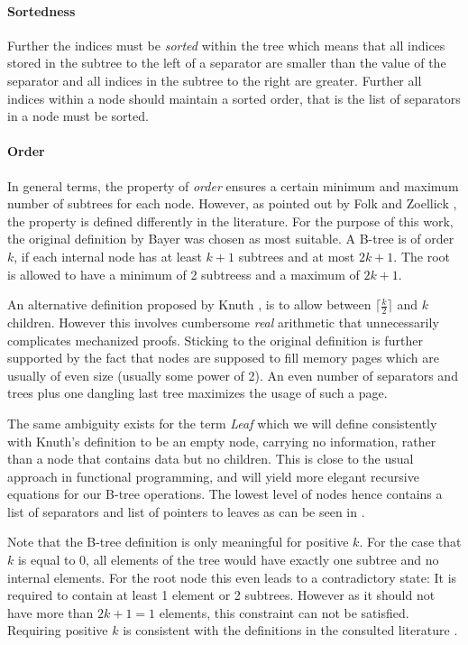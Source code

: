 \paragraph{Sortedness} Further the indices must be \textit{sorted} within the tree which means that all indices stored
in the subtree to the left of a separator are smaller than the value of the separator
and all indices in the subtree to the right are greater.
Further all indices within a node should maintain a sorted order,
that is the list of separators in a node must be sorted.

\paragraph{Order} In general terms, the property of \textit{order} ensures a certain minimum and maximum
number of subtrees for each node.
However, as pointed out by Folk and Zoellick \parencite{DBLP:books/daglib/0095349_mod},
the property is defined differently in the literature.
For the purpose of this work, the original definition by Bayer
was chosen as most suitable.
A B-tree is of order $k$, if each internal node has at least $k+1$
subtrees and at most $2k+1$.
The root is allowed to have a minimum of 2 subtreess and a maximum of $2k+1$.

An alternative definition proposed by Knuth \parencite{DBLP:books/lib/Knuth98a},
is to allow between $\lceil \frac{k}{2} \rceil$ and $k$ children.
However this involves cumbersome \textit{real} arithmetic that unnecessarily complicates
mechanized proofs.
Sticking to the original definition is further supported by the fact that nodes are supposed
to fill memory pages which are usually of even size (usually some power of 2).
An even number of separators and trees plus one dangling last tree maximizes
the usage of such a page.

The same ambiguity exists for the term \textit{Leaf} which we will define consistently with Knuth's definition \parencite{DBLP:books/lib/Knuth98a}
to be an empty node, carrying no information,
rather than a node that contains data but no children.
This is close to the usual approach in functional programming,
and will yield more elegant recursive equations for our B-tree operations.
The lowest level of nodes hence contains a list of separators and
list of pointers to leaves as can be seen in .

Note that the B-tree definition is only meaningful for positive $k$.
For the case that $k$ is equal to 0,
all elements of the tree would have exactly one subtree
and no internal elements.
For the root node this even leads to a contradictory state:
It is required to contain at least 1 element or 2 subtrees.
However as it should not have more than $2k+1 = 1$ elements,
this constraint can not be satisfied.
Requiring positive $k$ is consistent with the definitions
in the consulted literature \parencite{DBLP:journals/acta/BayerM72,DBLP:journals/csur/Comer79,DBLP:books/daglib/0023376}.


